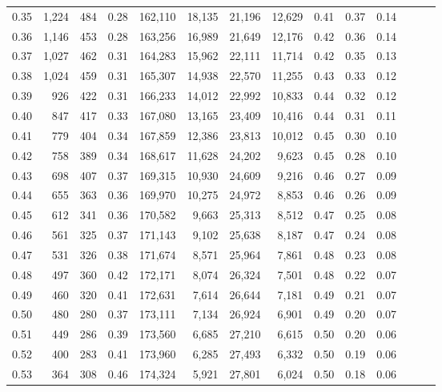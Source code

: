 \begin{tabular}{rrrrrrrrrrrrrr}
0.35 &  1,224 &  484 &  0.28 &  162,110 &   18,135 &  21,196 &  12,629 &  0.41 &  0.37 &      0.14 \\
0.36 &  1,146 &  453 &  0.28 &  163,256 &   16,989 &  21,649 &  12,176 &  0.42 &  0.36 &      0.14 \\
0.37 &  1,027 &  462 &  0.31 &  164,283 &   15,962 &  22,111 &  11,714 &  0.42 &  0.35 &      0.13 \\
0.38 &  1,024 &  459 &  0.31 &  165,307 &   14,938 &  22,570 &  11,255 &  0.43 &  0.33 &      0.12 \\
0.39 &    926 &  422 &  0.31 &  166,233 &   14,012 &  22,992 &  10,833 &  0.44 &  0.32 &      0.12 \\
0.40 &    847 &  417 &  0.33 &  167,080 &   13,165 &  23,409 &  10,416 &  0.44 &  0.31 &      0.11 \\
0.41 &    779 &  404 &  0.34 &  167,859 &   12,386 &  23,813 &  10,012 &  0.45 &  0.30 &      0.10 \\
0.42 &    758 &  389 &  0.34 &  168,617 &   11,628 &  24,202 &   9,623 &  0.45 &  0.28 &      0.10 \\
0.43 &    698 &  407 &  0.37 &  169,315 &   10,930 &  24,609 &   9,216 &  0.46 &  0.27 &      0.09 \\
0.44 &    655 &  363 &  0.36 &  169,970 &   10,275 &  24,972 &   8,853 &  0.46 &  0.26 &      0.09 \\
0.45 &    612 &  341 &  0.36 &  170,582 &    9,663 &  25,313 &   8,512 &  0.47 &  0.25 &      0.08 \\
0.46 &    561 &  325 &  0.37 &  171,143 &    9,102 &  25,638 &   8,187 &  0.47 &  0.24 &      0.08 \\
0.47 &    531 &  326 &  0.38 &  171,674 &    8,571 &  25,964 &   7,861 &  0.48 &  0.23 &      0.08 \\
0.48 &    497 &  360 &  0.42 &  172,171 &    8,074 &  26,324 &   7,501 &  0.48 &  0.22 &      0.07 \\
0.49 &    460 &  320 &  0.41 &  172,631 &    7,614 &  26,644 &   7,181 &  0.49 &  0.21 &      0.07 \\
0.50 &    480 &  280 &  0.37 &  173,111 &    7,134 &  26,924 &   6,901 &  0.49 &  0.20 &      0.07 \\
0.51 &    449 &  286 &  0.39 &  173,560 &    6,685 &  27,210 &   6,615 &  0.50 &  0.20 &      0.06 \\
0.52 &    400 &  283 &  0.41 &  173,960 &    6,285 &  27,493 &   6,332 &  0.50 &  0.19 &      0.06 \\
0.53 &    364 &  308 &  0.46 &  174,324 &    5,921 &  27,801 &   6,024 &  0.50 &  0.18 &      0.06 \\

\end{tabular}
